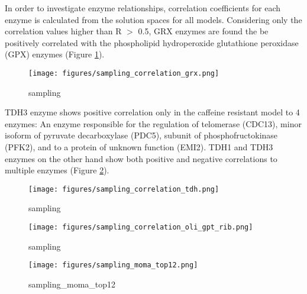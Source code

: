 In order to investigate enzyme relationships, correlation coefficients for each enzyme is calculated from the solution spaces for all models. Considering only the correlation values higher than R $>$ 0.5, GRX enzymes are found the be positively correlated with the phospholipid hydroperoxide glutathione peroxidase (GPX) enzymes (Figure \ref{fig:sampling_correlation_grx}).

\begin{figure}[H]
  \begin{center}
  \texttt{[image: figures/sampling\_correlation\_grx.png]}
  \caption[sampling]{sampling}
  \label{fig:sampling_correlation_grx}
  \end{center}
\end{figure}

TDH3 enzyme shows positive correlation only in the caffeine resistant model to 4 enzymes: An enzyme responsible for the regulation of telomerase (CDC13), minor isoform of pyruvate decarboxylase (PDC5), subunit of phosphofructokinase (PFK2), and to a protein of unknown function (EMI2). TDH1 and TDH3 enzymes on the other hand show both positive and negative correlations to multiple enzymes (Figure \ref{fig:sampling_correlation_tdh}).

\begin{figure}[H]
  \begin{center}
  \texttt{[image: figures/sampling\_correlation\_tdh.png]}
  \caption[sampling]{sampling}
  \label{fig:sampling_correlation_tdh}
  \end{center}
\end{figure}



\begin{figure}[H]
  \begin{center}
  \texttt{[image: figures/sampling\_correlation\_oli\_gpt\_rib.png]}
  \caption[sampling]{sampling}
  \label{fig:sampling_correlation_oli_gpt_rib}
  \end{center}
\end{figure}

\begin{figure}[H]
  \begin{center}
  \texttt{[image: figures/sampling\_moma\_top12.png]}
  \caption[sampling_moma_top12]{sampling_moma_top12}
  \label{fig:sampling_moma_top12}
  \end{center}
\end{figure}

